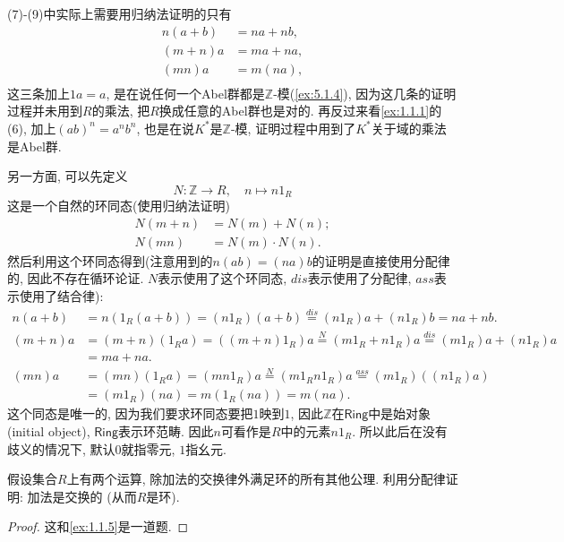 \begin{remark}
    (7)-(9)中实际上需要用归纳法证明的只有
    \[
    \begin{aligned}
        n(a + b) &= na + nb,\\
        (m + n)a &= ma + na,\\
        (mn)a &= m(na),\\
    \end{aligned}
    \]
    这三条加上$1a = a$, 是在说任何一个Abel群都是$\mathbb{Z}$-模(\ref{ex:5.1.4}), 因为这几条的证明过程并未用到$R$的乘法, 把$R$换成任意的Abel群也是对的. 再反过来看\ref{ex:1.1.1}的(6), 加上$(ab)^n = a^nb^n$, 也是在说$K^*$是$\mathbb{Z}$-模, 证明过程中用到了$K^*$关于域的乘法是Abel群.
    
    另一方面, 可以先定义
    \[
        N: \mathbb{Z} \to R,\quad n \mapsto n1_R
    \]
    这是一个自然的环同态(使用归纳法证明)
    \[
    \begin{aligned}
        N(m + n) &= N(m) + N(n);\\
        N(mn) &= N(m) \cdot N(n).
    \end{aligned}
    \]
    然后利用这个环同态得到(注意用到的$n(ab) = (na)b$的证明是直接使用分配律的, 因此不存在循环论证. $N$表示使用了这个环同态, $dis$表示使用了分配律, $ass$表示使用了结合律):
    \[
    \begin{aligned}
        n(a + b) &= n(1_R(a + b)) = (n1_R)(a + b) \overset{dis}= (n1_R)a + (n1_R)b = na + nb.\\
        (m + n)a &= (m + n)(1_Ra) = ((m + n)1_R)a \overset{N}= (m1_R + n1_R)a \overset{dis}= (m1_R)a + (n1_R)a\\
        &= ma + na.\\
        (mn)a &= (mn)(1_Ra) = (mn1_R)a \overset{N}= (m1_Rn1_R)a \overset{ass}= (m1_R)((n1_R)a)\\
        &= (m1_R)(na) = m(1_R(na)) = m(na).
    \end{aligned}
    \]
    这个同态是唯一的, 因为我们要求环同态要把$1$映到$1$, 因此$\mathbb{Z}$在$\mathsf{Ring}$中是始对象(initial object), $\mathsf{Ring}$表示环范畴. 因此$n$可看作是$R$中的元素$n1_R$. 所以此后在没有歧义的情况下, 默认$0$就指零元, $1$指幺元.
\end{remark}

\begin{problem}
    假设集合$R$上有两个运算, 除加法的交换律外满足环的所有其他公理. 利用分配律证明: 加法是交换的 (从而$R$是环).
\end{problem}

\begin{proof}
    这和\ref{ex:1.1.5}是一道题.
\end{proof}

